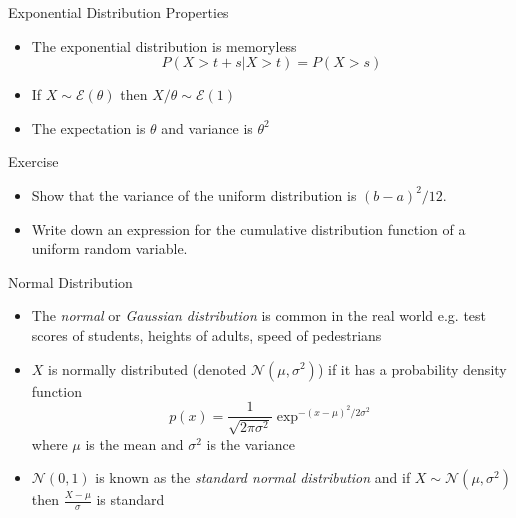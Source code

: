 \documentclass{beamer}
\begin{document}
\begin{frame}{Exponential Distribution Properties}
\begin{itemize} 
 \item The exponential distribution is memoryless 
 \begin{displaymath}
  P(X > t + s | X > t) = P(X > s)
 \end{displaymath}
\item If $X \sim \mathcal{E}(\theta)$ then $X/\theta \sim \mathcal{E}(1)$
\item The expectation is $\theta$ and variance is $\theta^2$ 
\end{itemize}
\end{frame}


\begin{frame}{Exercise} 
\begin{itemize} 
 \item Show that the variance of the uniform distribution is $(b-a)^2/12$. 
 \item Write down an expression for the cumulative distribution function of a uniform random variable.
\end{itemize}
\end{frame}



\begin{frame}{Normal Distribution}  
\begin{itemize} 
 \item The \emph{normal} or \emph{Gaussian distribution} is common in the real world e.g. test scores of students, heights of adults, speed of pedestrians 
\item $X$ is normally distributed (denoted $\mathcal{N}(\mu, \sigma^2)$) if it has a probability density function 
\begin{displaymath} 
 p(x) = \frac{1}{\sqrt{2\pi\sigma^2}}\exp^{-(x-\mu)^2/2\sigma^2} 
\end{displaymath}
where $\mu$ is the mean and $\sigma^2$ is the variance
\item $\mathcal{N}(0, 1)$ is known as the \emph{standard normal distribution} and if $X \sim \mathcal{N}(\mu, \sigma^2)$ then $\frac{X-\mu}{\sigma}$ is standard 
\end{itemize}
\end{frame}
\end{document}
